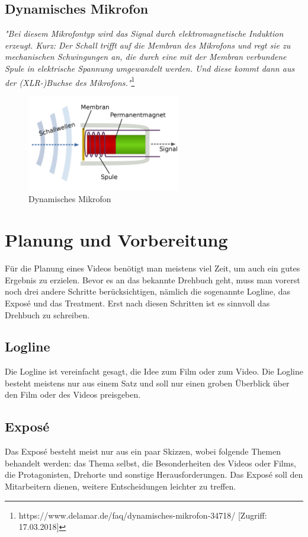 \subsection{Dynamisches Mikrofon}
\textit{"Bei diesem Mikrofontyp wird das Signal durch elektromagnetische Induktion erzeugt. Kurz: Der Schall trifft auf die Membran des Mikrofons und regt sie zu mechanischen Schwingungen an, die durch eine mit der Membran verbundene Spule in elektrische Spannung umgewandelt werden. Und diese kommt dann aus der (XLR-)Buchse des Mikrofons."}\footnote{\label{foot:12}https://www.delamar.de/faq/dynamisches-mikrofon-34718/ [Zugriff: 17.03.2018]}
\begin{figure}[h]
	\centering
	\includegraphics[width=0.6\textwidth]{abb9} 
	\caption{Dynamisches Mikrofon}
\end{figure}
\section{Planung und Vorbereitung}
Für die Planung eines Videos benötigt man meistens viel Zeit, um auch ein gutes Ergebnis zu erzielen. Bevor es an das bekannte Drehbuch geht, muss man vorerst noch drei andere Schritte berücksichtigen, nämlich die sogenannte Logline, das Expos\'{e} und das Treatment. Erst nach diesen Schritten ist es sinnvoll das Drehbuch zu schreiben. 
\subsection{Logline}
Die Logline ist vereinfacht gesagt, die Idee zum Film oder zum Video. Die Logline besteht meistens nur aus einem Satz und soll nur einen groben Überblick über den Film oder des Videos preisgeben. 
\subsection{Expos\'{e}}
Das Expos\'{e} besteht meist nur aus ein paar Skizzen, wobei folgende Themen behandelt werden: das Thema selbst, die Besonderheiten des Videos oder Films, die Protagonisten, Drehorte und sonstige Herausforderungen. Das Expos\'{e} soll den Mitarbeitern dienen, weitere Entscheidungen leichter zu treffen.
